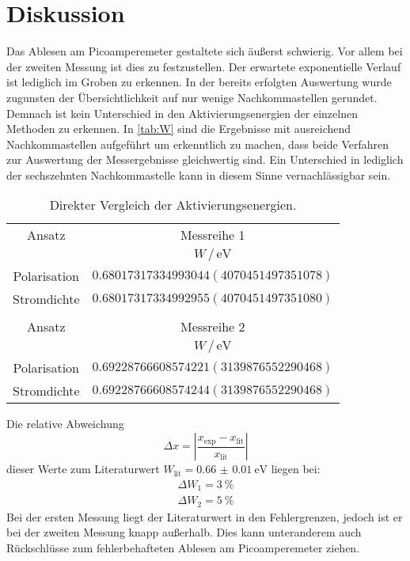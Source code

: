 \section{Diskussion}
\label{sec:Diskussion}
Das Ablesen am Picoamperemeter gestaltete sich äußerst schwierig. Vor allem bei der zweiten Messung ist dies zu festzustellen.
Der erwartete exponentielle Verlauf ist lediglich im Groben zu erkennen.
In der bereits erfolgten Auswertung wurde zugunsten der Übersichtlichkeit auf nur wenige Nachkommastellen gerundet.
Demnach ist kein Unterschied in den Aktivierungsenergien der einzelnen Methoden zu erkennen.
In \autoref{tab:W} sind die Ergebnisse mit ausreichend Nachkommastellen aufgeführt um erkenntlich zu machen,
dass beide Verfahren zur Auswertung der Messergebnisse gleichwertig sind. Ein Unterschied in lediglich der sechszehnten Nachkommastelle
kann in diesem Sinne vernachlässigbar sein.
\begin{table}[h]
    \centering
    \caption{Direkter Vergleich der Aktivierungsenergien.}
    \label{tab:W}
    \begin{tabular}{cS}
        \toprule
        {Ansatz} & {Messreihe 1}\\
        \cmidrule(lr){2-2} 
        &{$W \, / \, \si{\electronvolt}$} \\
        \midrule
        {Polarisation} & {$0.68017317334993044(4070451497351078)$} \\   
        {Stromdichte}  & {$0.68017317334992955(4070451497351080)$} \\
        \bottomrule
        \\
        \toprule
        {Ansatz} & {Messreihe 2}\\ 
        \cmidrule(lr){2-2} 
        &{$W \, / \, \si{\electronvolt}$} \\
        \midrule
        {Polarisation} & {$0.69228766608574221(3139876552290468)$} \\ 
        {Stromdichte}  & {$0.69228766608574244(3139876552290468)$} \\
        \bottomrule
        \end{tabular}
\end{table}

\noindent
Die relative Abweichung
\begin{equation}
    \Delta x = \left| \frac{x_\text{exp} - x_\text{lit}}{x_\text{lit}}\right|
\end{equation}
dieser Werte zum Literaturwert $W_\text{lit} = \qty{0.66(1)}{\electronvolt}$\cite{Buch} liegen bei:
\begin{align}
    \Delta W_1 = \qty{3}{\percent} \\
    \Delta W_2 = \qty{5}{\percent}
\end{align}
Bei der ersten Messung liegt der Literaturwert in den Fehlergrenzen, jedoch ist er bei der zweiten Messung knapp außerhalb.
Dies kann unteranderem auch Rückschlüsse zum fehlerbehafteten Ablesen am Picoamperemeter ziehen.

